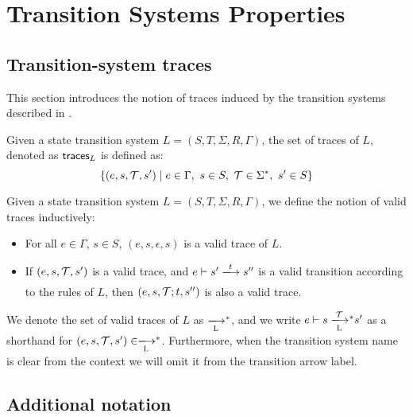 \section{Transition Systems Properties}
\label{sec:ts-properties}


\subsection{Transition-system traces}
\label{sec:ts-traces}

This section introduces the notion of traces induced by the transition systems
described in \cite{small_step_semantics}.

\begin{definition}[Traces]
  Given a state transition system $L=(S,T,\Sigma, R, \Gamma)$, the set of
  traces of $L$, denoted as $\mathsf{traces}_L$ is defined as:
  $$
  \{ (e, s, \mathcal{T}, s') \mid e \in \Gamma,~ s \in S,~ \mathcal{T} \in \Sigma^{*},~ s' \in S\}
  $$

\end{definition}


\begin{definition}
  Given a state transition system $L=(S,T,\Sigma, R, \Gamma)$, we define the
  notion of valid traces inductively:

  \begin{itemize}
  \item For all $e \in \Gamma$, $s \in S$, $(e, s, \epsilon, s)$ is a valid
    trace of $L$.

  \item If $(e, s, \mathcal{T}, s')$ is a valid trace, and
    $e \vdash s' \trans{}{\var{t}} s''$ is a valid transition according to the
    rules of $L$, then $(e, s, \mathcal{T}; t, s'')$ is also a valid trace.
  \end{itemize}

\end{definition}

We denote the set of valid traces of $L$ as $\transtar{L}{}$, and we write
$e \vdash s \transtar{L}{\txs} s'$ as a shorthand for
$(e, s, \txs, s') \in \transtar{L}{}$. Furthermore, when the transition system
name is clear from the context we will omit it from the transition arrow label.

\subsection{Additional notation}
\label{sec:additional-notation}


